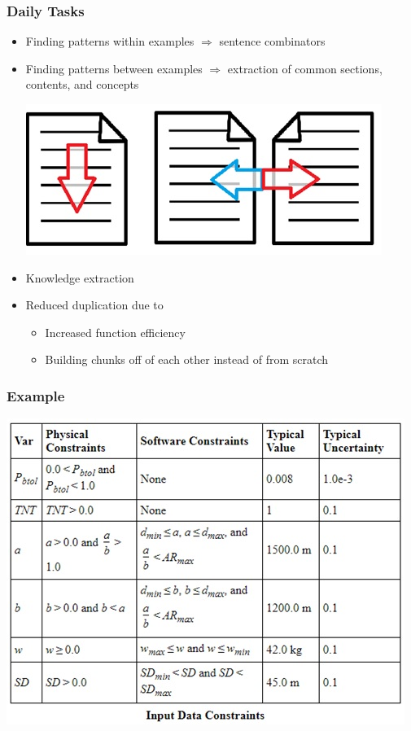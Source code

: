 \documentclass{beamer}
\begin{document}
\begin{frame}
\frametitle{Daily Tasks}
\begin{itemize}
 \item<1-> Finding patterns within examples $\Rightarrow$ sentence combinators
 \item<1-> Finding patterns between examples $\Rightarrow$ extraction of common sections, contents, and concepts
 \begin{center}
  \includegraphics[scale=0.6]{WinAndBwExamples.jpg}
 \end{center}
 \item<2-> Knowledge extraction
 \item<2-> Reduced duplication due to
  \begin{itemize}
   \item Increased function efficiency
   \item Building chunks off of each other instead of from scratch
  \end{itemize}
\end{itemize}
\end{frame}

\begin{frame}
\frametitle{Example}
\centering
\includegraphics[scale=0.7]{InDataConsEx.jpg}
\end{frame}
\end{document}
